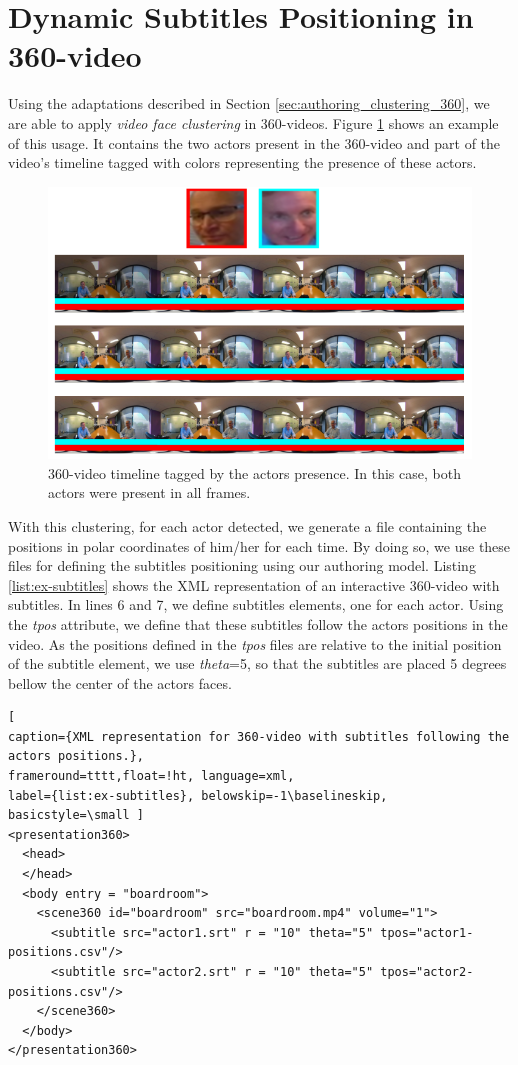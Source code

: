 \section{Dynamic Subtitles Positioning in 360-video}
\label{sec:authoring_discussion}

Using the adaptations described in Section \ref{sec:authoring_clustering_360}, we are able to apply \emph{video face clustering} in 360-videos. Figure \ref{fig:360_video_timeline} shows an example of this usage. It contains the two actors present in the 360-video and part of the video's timeline tagged with colors representing the presence of these actors.

\begin{figure}[!ht]
    \centering
    \includegraphics[width=0.88\linewidth]{img/video360/timeline-360.png}
    \caption{360-video timeline tagged by the actors presence. In this case, both actors were present in all frames.}
    \label{fig:360_video_timeline}
\end{figure}

With this clustering, for each actor detected, we generate a file containing the positions in polar coordinates of him/her for each time. By doing so, we use these files for defining the subtitles positioning using our authoring model. Listing \ref{list:ex-subtitles} shows the XML representation of an interactive 360-video with subtitles. In lines 6 and 7, we define subtitles elements, one for each actor. Using the \emph{tpos} attribute, we define that these subtitles follow the actors positions in the video. As the positions defined in the \emph{tpos} files are relative to the initial position of the subtitle element, we use \emph{theta}=5, so that the subtitles are placed 5 degrees bellow the center of the actors faces.


\begin{lstlisting}[
caption={XML representation for 360-video with subtitles following the actors positions.},
frameround=tttt,float=!ht, language=xml, 
label={list:ex-subtitles}, belowskip=-1\baselineskip, basicstyle=\small ]
<presentation360>
  <head>
  </head>
  <body entry = "boardroom">
    <scene360 id="boardroom" src="boardroom.mp4" volume="1">   
      <subtitle src="actor1.srt" r = "10" theta="5" tpos="actor1-positions.csv"/>      
      <subtitle src="actor2.srt" r = "10" theta="5" tpos="actor2-positions.csv"/>
    </scene360>
  </body>
</presentation360>
\end{lstlisting}


